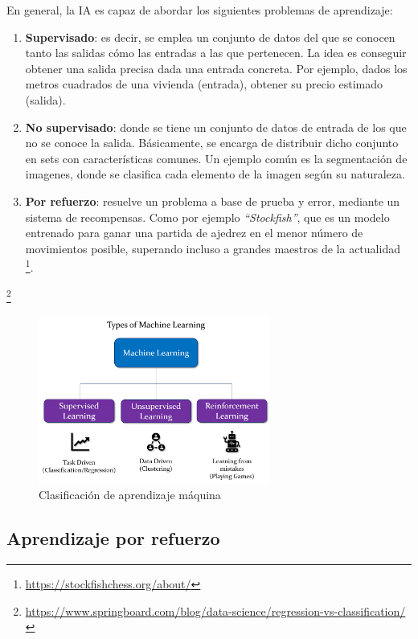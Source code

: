 En general, la \ac{IA} es capaz de abordar los siguientes problemas de aprendizaje:

\begin{enumerate}
	\item \textbf{Supervisado}: es decir, se emplea un conjunto de datos del que se conocen tanto las salidas cómo las entradas a las que pertenecen. La idea es conseguir obtener una salida precisa dada una entrada concreta. Por ejemplo, dados los metros cuadrados de una vivienda (entrada), obtener su precio estimado (salida).

	\item \textbf{No supervisado}: donde se tiene un conjunto de datos de entrada de los que no se conoce la salida. Básicamente, se encarga de distribuir dicho conjunto en sets con características comunes. Un ejemplo común es la segmentación de imagenes, donde se clasifica cada elemento de la imagen según su naturaleza.
	
    \item \textbf{Por refuerzo}: resuelve un problema a base de prueba y error, mediante un sistema de recompensas. Como por ejemplo \emph{``Stockfish''}, que es un modelo entrenado para ganar una partida de ajedrez en el menor número de movimientos posible, superando incluso a grandes maestros de la actualidad \footnote[15]{\url{https://stockfishchess.org/about/}}.
\end{enumerate} \footnote[16]{\url{https://www.springboard.com/blog/data-science/regression-vs-classification/}}

\begin{figure} [H]
	\begin{center}
	\includegraphics[height=5.5cm]{imagenes/cap1/8_AI_types.png}
	\end{center}
	\caption[Clasificación de aprendizaje máquina]{Clasificación de aprendizaje máquina}
	\label{fig:ai_types}
\end{figure}

\subsection{Aprendizaje por refuerzo}
\label{subsec:aprendizaje_por_refuerzo}

